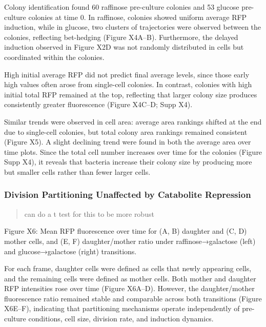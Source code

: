 Colony identification found 60 raffinose pre-culture colonies and 53
glucose pre-culture colonies at time 0. In raffinose, colonies showed
uniform average RFP induction, while in glucose, two clusters of
trajectories were observed between the colonies, reflecting bet-hedging
(Figure X4A--B). Furthermore, the delayed induction observed in Figure
X2D was not randomly distributed in cells but coordinated within the
colonies.

High initial average RFP did not predict final average levels, since
those early high values often arose from single-cell colonies. In
contrast, colonies with high initial total RFP remained at the top,
reflecting that larger colony size produces consistently greater
fluorescence (Figure X4C--D; Supp X4).

Similar trends were observed in cell area: average area rankings shifted
at the end due to single-cell colonies, but total colony area rankings
remained consistent (Figure X5). A slight declining trend were found in
both the average area over time plots. Since the total cell number
increases over time for the colonies (Figure Supp X4), it reveals that
bacteria increase their colony size by producing more but smaller cells
rather than fewer larger cells.

\subsubsection{Division Partitioning Unaffected by Catabolite
Repression}\label{division-partitioning-unaffected-by-catabolite-repression}

\begin{quote}
can do a t test for this to be more robust
\end{quote}

Figure X6: Mean RFP fluorescence over time for (A, B) daughter and (C,
D) mother cells, and (E, F) daughter/mother ratio under
raffinose→galactose (left) and glucose→galactose (right) transitions.

For each frame, daughter cells were defined as cells that newly
appearing cells, and the remaining cells were defined as mother cells.
Both mother and daughter RFP intensities rose over time (Figure X6A--D).
However, the daughter/mother fluorescence ratio remained stable and
comparable across both transitions (Figure X6E--F), indicating that
partitioning mechanisms operate independently of pre-culture conditions,
cell size, division rate, and induction dynamics.
